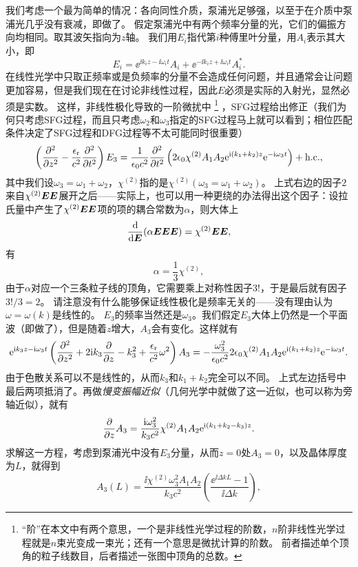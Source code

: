 我们考虑一个最为简单的情况：各向同性介质，泵浦光足够强，以至于在介质中泵浦光几乎没有衰减，即做了。
假定泵浦光中有两个频率分量的光，它们的偏振方向均相同。取其波矢指向为$z$轴。
我们用$E_i$指代第$i$种傅里叶分量，用$A_i$表示其大小，即
\[
    E_i = \ee^{\ii k_i z - \ii \omega_i t} A_i + \ee^{- \ii k_i z + \ii \omega_i t} A_i^*.
\]
在线性光学中只取正频率或是负频率的分量不会造成任何问题，并且通常会让问题更加容易，但是我们现在在讨论非线性过程，因此$E$必须是实际的入射光，显然必须是实数。
这样，非线性极化导致的一阶微扰中%
\footnote{
    “阶”在本文中有两个意思，一个是非线性光学过程的阶数，$n$阶非线性光学过程就是$n$束光变成一束光；还有一个意思是微扰计算的阶数。
    前者描述单个顶角的粒子线数目，后者描述一张图中顶角的总数。
}%
，SFG过程给出修正（我们为何只考虑SFG过程，而且只考虑$\omega_2$和$\omega_3$指定的SFG过程马上就可以看到；相位匹配条件决定了SFG过程和DFG过程等不太可能同时很重要）
\[
    \left( \pdv[2]{z} - \frac{\epsilon_\text{r}}{c^2} \pdv[2]{t} \right) E_3 = \frac{1}{\epsilon_0 c^2} \pdv[2]{t} \left( 2 \epsilon_0  \chi^{(2)} A_1 A_2 \mathrm{e}^{\mathrm{i} (k_1 + k_2) z} \mathrm{e}^{-\mathrm{i} \omega_3 t} \right) + \text{h.c.},
\]
其中我们设$\omega_3 = \omega_1 + \omega_2$，$\chi^{(2)}$指的是$\chi^{(2)}(\omega_3=\omega_1+\omega_2)$。
上式右边的因子$2$来自$\chi^{(2)} \vb*{E} \vb*{E}$展开之后——实际上，也可以用一种更绕的办法得出这个因子：设拉氏量中产生了$\chi^{(2)} \vb*{E} \vb*{E}$项的项的耦合常数为$\alpha$，则大体上
\[
    \dv{\vb*{E}} (\alpha \vb*{E} \vb*{E} \vb*{E}) = \chi^{(2)} \vb*{E} \vb*{E},
\]
有
\[
    \alpha = \frac{1}{3} \chi^{(2)},
\]
由于$\alpha$对应一个三条粒子线的顶角，它需要乘上对称性因子$3!$，于是最后就有因子$3! / 3 = 2$。
请注意没有什么能够保证线性极化是频率无关的——没有理由认为$\omega=\omega(k)$是线性的。
$E_3$的频率当然还是$\omega_3$。我们假定$E_3$大体上仍然是一个平面波（即做了），但是随着$z$增大，$A_3$会有变化。这样就有
\[
    \mathrm{e}^{\mathrm{i} k_3 z - \mathrm{i} \omega_3 t} \left( \pdv[2]{z} + 2 \mathrm{i} k_3 \pdv{z} - k_3^2 + \frac{\epsilon_\text{r}}{c^2} \omega^2 \right) A_3 = - \frac{\omega_3^2}{\epsilon_0 c^2} 2 \epsilon_0  \chi^{(2)} A_1 A_2 \mathrm{e}^{\mathrm{i} (k_1 + k_2) z} \mathrm{e}^{-\mathrm{i} \omega_3 t} .
\]
由于色散关系可以不是线性的，从而$k_3$和$k_1 + k_2$完全可以不同。
上式左边括号中最后两项抵消了。再做\emph{慢变振幅近似}（几何光学中就做了这一近似，也可以称为旁轴近似），就有
\[
    \pdv{z} A_3 = \frac{\mathrm{i} \omega_3^2}{k_3 c^2} \chi^{(2)} A_1 A_2 \mathrm{e}^{\mathrm{i} (k_1 + k_2 - k_3) z}.
\]
求解这一方程，考虑到泵浦光中没有$E_3$分量，从而$z=0$处$A_3=0$，以及晶体厚度为$L$，就得到
\begin{equation}
    A_3(L) = \frac{\ii \chi^{(2)} \omega_3^2 A_1 A_2}{k_3 c^2} \left( \frac{\ee^{\ii \Delta k L} - 1}{\ii \Delta k} \right),
    \label{eq:two-pump-a3}
\end{equation}
